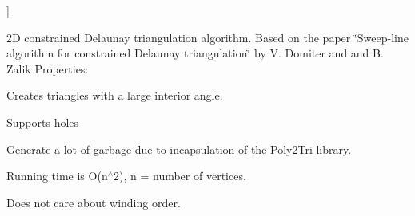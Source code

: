 \begin{Desc}
\begin{description}
{}]\item[{\em 
\hypertarget{namespace_farseer_physics_1_1_common_1_1_decomposition_aaf4a6ce83f6797b197ff74a08b9f4575a6601e04d7cfa7c4f369d32e14b0ff0e2}{Delauny}\label{namespace_farseer_physics_1_1_common_1_1_decomposition_aaf4a6ce83f6797b197ff74a08b9f4575a6601e04d7cfa7c4f369d32e14b0ff0e2}
}]2\+D constrained Delaunay triangulation algorithm. Based on the paper \char`\"{}\+Sweep-\/line algorithm for constrained Delaunay triangulation\char`\"{} by V. Domiter and and B. Zalik Properties\+:
\begin{DoxyItemize}
\item Creates triangles with a large interior angle.
\item Supports holes
\item Generate a lot of garbage due to incapsulation of the Poly2\+Tri library.
\item Running time is O(n$^\wedge$2), n = number of vertices.
\item Does not care about winding order. 
\end{DoxyItemize}\end{description}
\end{Desc}
